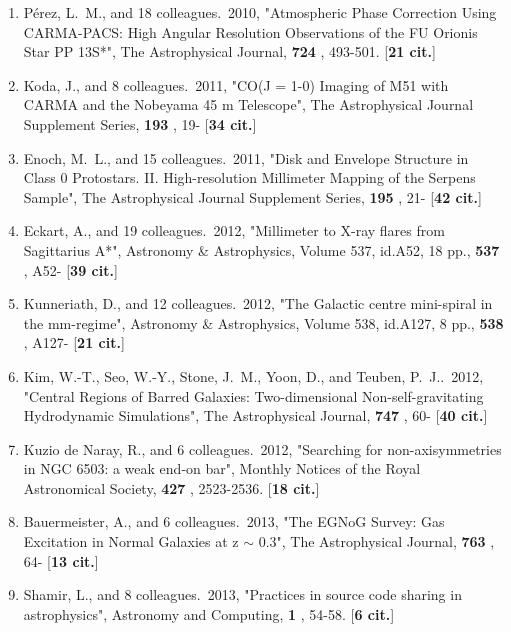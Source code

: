 \documentclass[11pt,letterpaper]{article}
\newcommand{\amp}{\&}
\newcommand{\ap}{$\sim$}
\begin{document}
\begin{enumerate}[resume,label=\textbf{\arabic*}.]
\item  
P{\'e}rez, L.~M., and 18 colleagues.\  2010,  "Atmospheric Phase Correction 
Using CARMA-PACS: High Angular Resolution Observations of the FU Orionis 
Star PP 13S*", The Astrophysical Journal,  {\bf 724} , 493-501.  [{\bf 21 
cit.}] 

\item  
Koda, J., and 8 colleagues.\  2011,  "CO(J = 1-0) Imaging of M51 with CARMA 
and the Nobeyama 45 m Telescope", The Astrophysical Journal Supplement 
Series,  {\bf 193} , 19- [{\bf 34 cit.}] 

\item  
Enoch, M.~L., and 15 colleagues.\  2011,  "Disk and Envelope Structure in 
Class 0 Protostars. II. High-resolution Millimeter Mapping of the Serpens 
Sample", The Astrophysical Journal Supplement Series,  {\bf 195} , 21- 
[{\bf 42 cit.}] 

\item  
Eckart, A., and 19 colleagues.\  2012,  "Millimeter to X-ray flares from 
Sagittarius A*", Astronomy {\amp} Astrophysics, Volume 537, id.A52, 18 
pp.,  {\bf 537} , A52- [{\bf 39 cit.}] 

\item  
Kunneriath, D., and 12 colleagues.\  2012,  "The Galactic centre 
mini-spiral in the mm-regime", Astronomy {\amp} Astrophysics, Volume 538, 
id.A127, 8 pp.,  {\bf 538} , A127- [{\bf 21 cit.}] 

\item  
Kim, W.-T., Seo, W.-Y., Stone, J.~M., Yoon, D., and Teuben, P.~J..\  2012,  
"Central Regions of Barred Galaxies: Two-dimensional Non-self-gravitating 
Hydrodynamic Simulations", The Astrophysical Journal,  {\bf 747} , 60- 
[{\bf 40 cit.}] 

\item  
Kuzio de Naray, R., and 6 colleagues.\  2012,  "Searching for 
non-axisymmetries in NGC 6503: a weak end-on bar", Monthly Notices of the 
Royal Astronomical Society,  {\bf 427} , 2523-2536.  [{\bf 18 cit.}] 

\item  
Bauermeister, A., and 6 colleagues.\  2013,  "The EGNoG Survey: Gas 
Excitation in Normal Galaxies at z {\ap} 0.3", The Astrophysical Journal,  
{\bf 763} , 64- [{\bf 13 cit.}] 

\item  
Shamir, L., and 8 colleagues.\  2013,  "Practices in source code sharing in 
astrophysics", Astronomy and Computing,  {\bf 1} , 54-58.  [{\bf 6 cit.}] 


\end{enumerate}
\end{document}
